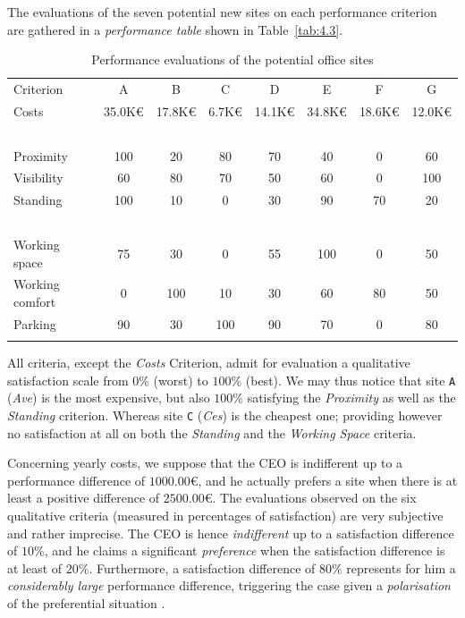 The evaluations of the seven potential new sites on each performance criterion are gathered in a \emph{performance table} shown in Table~\vref{tab:4.3}.
\begin{table}[ht]
\caption{Performance evaluations of the potential office sites}
\label{tab:4.3}       %
\begin{center}
    \begin{tabular}{l|c|c|c|c|c|c|c}
      \svhline\noalign{\smallskip}
    Criterion  &    A  &      B &       C &       D &       E &        F &        G\\
       \noalign{\smallskip}\hline\noalign{\smallskip}

    Costs      &   35.0K€ &  17.8K€  & 6.7K€  &  14.1K€ &  34.8K€ &  18.6K€ &  12.0K€\\
    \          &   \      &  \     &   \     &   \    &    \    &    \    &    \ \\
    Proximity     &   100    &  20 &      80    &   70    &   40    &   0    &    60 \\
    Visibility     &   60     &  80  &     70    &   50    &   60    &   0    &    100 \\
    Standing      &   100   &   10   &    0     &   30    &   90    &   70   &    20 \\
    \           &   \     &   \    &    \     &   \     &   \     &   \    &    \  \\
    Working space      &   75    &   30   &    0     &   55    &   100   &   0    &    50  \\
    Working comfort      &   0     &   100  &    10    &   30    &   60    &   80   &    50 \\
    Parking     &   90    &   30   &    100   &   90    &   70    &   0    &    80 \\
      \noalign{\smallskip}\hline
    \end{tabular}
  \end{center}
\end{table}
All criteria, except the \emph{Costs} Criterion, admit for evaluation a qualitative satisfaction scale from $0\%$ (worst) to $100\%$ (best). We may thus notice that site \texttt{A} (\emph{Ave}) is the most expensive, but also $100\%$ satisfying the \emph{Proximity} as well as the  \emph{Standing} criterion. Whereas site \texttt{C} (\emph{Ces}) is the cheapest one; providing however no satisfaction at all on both the \emph{Standing} and the \emph{Working Space} criteria.

Concerning yearly costs, we suppose that the CEO is indifferent up to a performance difference of $1000.00$€, and he actually prefers a site when there is at least a positive difference of $2500.00$€. The evaluations observed on the six qualitative criteria (measured in percentages of satisfaction) are very subjective and rather imprecise. The CEO is hence \emph{indifferent} up to a satisfaction difference of $10\%$, and he claims a significant \emph{preference} when the satisfaction difference is at least of $20\%$.  Furthermore, a satisfaction difference of $80\%$ represents for him a \emph{considerably large} performance difference, triggering the case given a \emph{polarisation} of the preferential situation \citep{BIS-2013}. 

